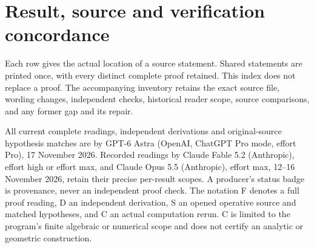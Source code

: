 \section{Result, source and verification concordance}\label{app:II:result-index}
Each row gives the actual location of a source statement. Shared statements
are printed once, with every distinct complete proof retained. This index
does not replace a proof. The accompanying inventory retains the exact
source file, wording changes, independent checks, historical reader scope,
source comparisons, and any former gap and its repair.

All current complete readings, independent derivations and original-source
hypothesis matches are by GPT-6 Astra (OpenAI, ChatGPT Pro mode, effort Pro),
17 November 2026. Recorded readings by Claude Fable 5.2 (Anthropic), effort
high or effort max, and Claude Opus 5.5 (Anthropic), effort max,
12--16 November 2026, retain their precise per-result scopes. A producer's
status badge is provenance, never an independent proof check. The notation
F denotes a full proof reading, D an independent derivation, S an opened
operative source and matched hypotheses, and C an actual computation rerun.
C is limited to the program's finite algebraic or numerical scope and does
not certify an analytic or geometric construction.

